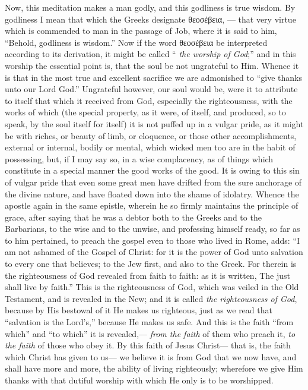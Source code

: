 \documentclass[10pt, twocolumn, oneside, a4paper]{memoir}
\newcommand{\greektext}[1]{\foreignlanguage{greek}{#1}}
\newcommand{\gloss}[1]{%
    \marginpar[\RaggedLeft \footnotesize{#1}]{\RaggedRight \footnotesize{#1}}}
\begin{document}
Now, this meditation makes a man godly, and this godliness is true wisdom. By godliness I mean that which the Greeks designate \greektext{θεοσέβεια}, — that very virtue which is commended to man in the passage of Job, where it is said to him, ``Behold, godliness is wisdom.'' \gloss{Job 28:28} Now if the word \greektext{θεοσέβεια} be interpreted according to its derivation, it might be called `` \textit{the worship of God};''  and in this worship the essential point is, that the soul be not ungrateful to Him. Whence it is that in the most true and excellent sacrifice we are admonished to ``give thanks unto our Lord God.''  Ungrateful however, our soul would be, were it to attribute to itself that which it received from God, especially the righteousness, with the works of which (the special property, as it were, of itself, and produced, so to speak, by the soul itself for itself) it is not puffed up in a vulgar pride, as it might be with riches, or beauty of limb, or eloquence, or those other accomplishments, external or internal, bodily or mental, which wicked men too are in the habit of possessing, but, if I may say so, in a wise complacency, as of things which constitute in a special manner the good works of the good. It is owing to this sin of vulgar pride that even some great men have drifted from the sure anchorage of the divine nature, and have floated down into the shame of idolatry. Whence the apostle again in the same epistle, wherein he so firmly maintains the principle of grace, after saying that he was a debtor both to the Greeks and to the Barbarians, to the wise and to the unwise, and professing himself ready, so far as to him pertained, to preach the gospel even to those who lived in Rome, adds: ``I am not ashamed of the Gospel of Christ: for it is the power of God unto salvation to every one that believes; to the Jew first, and also to the Greek. For therein is the righteousness of God revealed from faith to faith: as it is written, The just shall live by faith.'' \gloss{Romans 1:14-17} This is the righteousness of God, which was veiled in the Old Testament, and is revealed in the New; and it is called \textit{the righteousness of God}, because by His bestowal of it He makes us righteous, just as we read that ``salvation is the Lord's,''  because He makes us safe. And this is the faith ``from which'' and ``to which'' it is revealed,— \textit{from the faith} of them who preach it, \textit{to the faith} of those who obey it. By this faith of Jesus Christ— that is, the faith which Christ has given to us— we believe it is from God that we now have, and shall have more and more, the ability of living righteously; wherefore we give Him thanks with that dutiful worship with which He only is to be worshipped.
\end{document}
